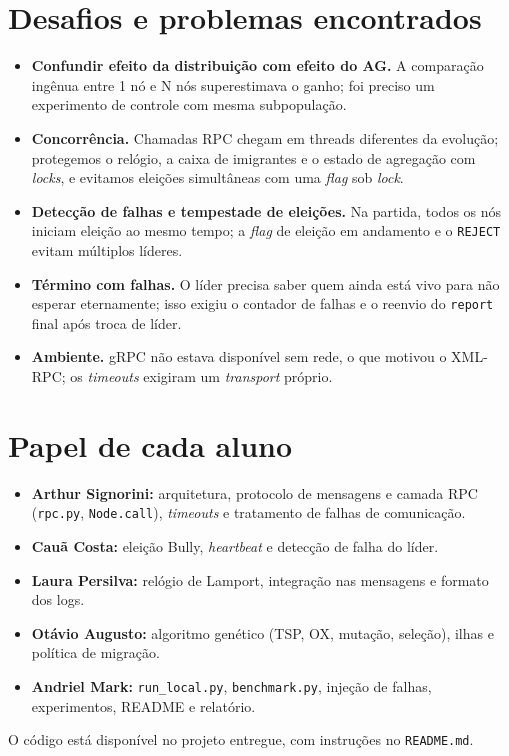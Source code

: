 \documentclass[12pt]{article}
\newcommand{\code}[1]{\texttt{\small #1}}
\begin{document}
\section{Desafios e problemas encontrados}
\begin{itemize}
\item \textbf{Confundir efeito da distribuição com efeito do AG.} A comparação ingênua entre 1 nó e N nós superestimava o ganho; foi preciso um experimento de controle com mesma subpopulação.
\item \textbf{Concorrência.} Chamadas RPC chegam em threads diferentes da evolução; protegemos o relógio, a caixa de imigrantes e o estado de agregação com \textit{locks}, e evitamos eleições simultâneas com uma \textit{flag} sob \textit{lock}.
\item \textbf{Detecção de falhas e tempestade de eleições.} Na partida, todos os nós iniciam eleição ao mesmo tempo; a \textit{flag} de eleição em andamento e o \code{REJECT} evitam múltiplos líderes.
\item \textbf{Término com falhas.} O líder precisa saber quem ainda está vivo para não esperar eternamente; isso exigiu o contador de falhas e o reenvio do \code{report} final após troca de líder.
\item \textbf{Ambiente.} gRPC não estava disponível sem rede, o que motivou o XML-RPC; os \textit{timeouts} exigiram um \textit{transport} próprio.
\end{itemize}

\section{Papel de cada aluno}
\begin{itemize}
\item \textbf{Arthur Signorini:} arquitetura, protocolo de mensagens e camada RPC (\code{rpc.py}, \code{Node.call}), \textit{timeouts} e tratamento de falhas de comunicação.
\item \textbf{Cauã Costa:} eleição Bully, \textit{heartbeat} e detecção de falha do líder.
\item \textbf{Laura Persilva:} relógio de Lamport, integração nas mensagens e formato dos logs.
\item \textbf{Otávio Augusto:} algoritmo genético (TSP, OX, mutação, seleção), ilhas e política de migração.
\item \textbf{Andriel Mark:} \code{run\_local.py}, \code{benchmark.py}, injeção de falhas, experimentos, README e relatório.
\end{itemize}
O código está disponível no projeto entregue, com instruções no \code{README.md}.
\end{document}

